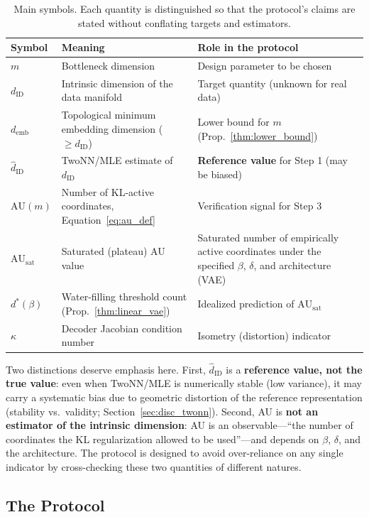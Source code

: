 \documentclass[make,article,submit,pdftex,moreauthors]{Definitions/mdpi}
\newcommand{\dID}{d_{\mathrm{ID}}}
\newcommand{\hatdID}{\hat{d}_{\mathrm{ID}}}
\newcommand{\kap}{\kappa}
\newcommand{\AUsat}{\mathrm{AU}_{\mathrm{sat}}}
\newcommand{\demb}{d_{\mathrm{emb}}}
\newcommand{\dstar}{d^{*}(\beta)}
\begin{document}
\begin{table}[H]
\caption{Main symbols. Each quantity is distinguished so that the protocol's
claims are stated without conflating targets and estimators.}
\label{tab:notation}
\small
\begin{tabular}{lp{5.6cm}p{4.9cm}}
\toprule
\textbf{Symbol} & \textbf{Meaning} & \textbf{Role in the protocol} \\
\midrule
$m$ & Bottleneck dimension & Design parameter to be chosen \\
$\dID$ & Intrinsic dimension of the data manifold & Target quantity (unknown for real data) \\
$\demb$ & Topological minimum embedding dimension ($\geq \dID$) & Lower bound for $m$ (Prop.~\ref{thm:lower_bound}) \\
$\hatdID$ & TwoNN/MLE estimate of $\dID$ & \textbf{Reference value} for Step 1 (may be biased) \\
$\mathrm{AU}(m)$ & Number of KL-active coordinates, Equation~\eqref{eq:au_def} & Verification signal for Step 3 \\
$\AUsat$ & Saturated (plateau) AU value & Saturated number of empirically active coordinates under the specified $\beta$, $\delta$, and architecture (VAE) \\
$\dstar$ & Water-filling threshold count (Prop.~\ref{thm:linear_vae}) & Idealized prediction of $\AUsat$ \\
$\kap$ & Decoder Jacobian condition number & Isometry (distortion) indicator \\
\bottomrule
\end{tabular}
\end{table}

Two distinctions deserve emphasis here.
First, $\hatdID$ is a \textbf{reference value, not the true value}: even
when TwoNN/MLE is numerically stable (low variance), it may carry a
systematic bias due to geometric distortion of the reference representation
(stability vs.\ validity; Section~\ref{sec:disc_twonn}).
Second, AU is \textbf{not an estimator of the intrinsic dimension}: AU is an
observable---``the number of coordinates the KL regularization allowed to be
used''---and depends on $\beta$, $\delta$, and the architecture.
The protocol is designed to avoid over-reliance on any single indicator by
cross-checking these two quantities of different natures.

\subsection{The Protocol}\label{sec:protocol_main}
\end{document}
